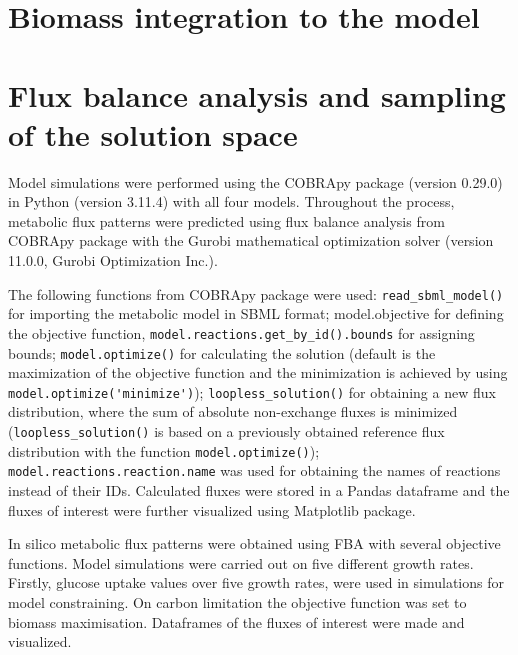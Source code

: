 \section{Biomass integration to the model}




\section{Flux balance analysis and sampling of the solution space} 

Model simulations were performed using the COBRApy
package (version 0.29.0) \cite{Ebrahim2013} in Python (version 3.11.4) with all four models. 
Throughout the process, metabolic flux patterns were predicted using flux balance analysis \cite{Orth2010} from COBRApy package with the Gurobi mathematical optimization solver (version 11.0.0, Gurobi Optimization Inc.). 

The following functions from COBRApy package were used:
\verb|read_sbml_model()| for importing the metabolic model in SBML format; model.objective for defining the objective function, \verb|model.reactions.get_by_id().bounds| for assigning bounds; \verb|model.optimize()| for calculating the solution (default is the maximization of the objective function and the minimization is achieved by using \verb|model.optimize('minimize')|); \verb|loopless_solution()| for obtaining a new flux distribution, where the sum of absolute non-exchange fluxes is minimized (\verb|loopless_solution()| is based on a previously obtained reference flux distribution with the function \verb|model.optimize()|); \verb|model.reactions.reaction.name| was used for obtaining the names of reactions instead of their IDs.
Calculated fluxes were stored in a Pandas dataframe and the fluxes of interest were further visualized using Matplotlib package.

In silico metabolic flux patterns were obtained using FBA with several objective functions. 
Model simulations were carried out on five different growth rates.
Firstly, glucose uptake values 
over five growth rates, were used in simulations for model constraining. On carbon limitation the objective function was set to biomass maximisation. Dataframes of the fluxes of interest were made and visualized.

